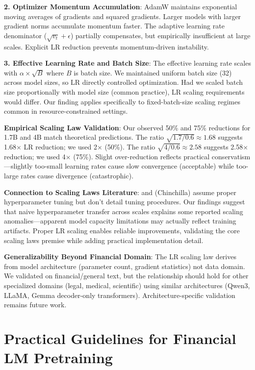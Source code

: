 \textbf{2. Optimizer Momentum Accumulation}: AdamW maintains exponential moving averages of gradients and squared gradients. Larger models with larger gradient norms accumulate momentum faster. The adaptive learning rate denominator ($\sqrt{v_t} + \epsilon$) partially compensates, but empirically insufficient at large scales. Explicit LR reduction prevents momentum-driven instability.

\textbf{3. Effective Learning Rate and Batch Size}: The effective learning rate scales with $\alpha \times \sqrt{B}$ where $B$ is batch size. We maintained uniform batch size (32) across model sizes, so LR directly controlled optimization. Had we scaled batch size proportionally with model size (common practice), LR scaling requirements would differ. Our finding applies specifically to fixed-batch-size scaling regimes common in resource-constrained settings.

\textbf{Empirical Scaling Law Validation}: Our observed 50\% and 75\% reductions for 1.7B and 4B match theoretical predictions. The ratio $\sqrt{1.7/0.6} \approx 1.68$ suggests 1.68$\times$ LR reduction; we used 2$\times$ (50\%). The ratio $\sqrt{4/0.6} \approx 2.58$ suggests 2.58$\times$ reduction; we used 4$\times$ (75\%). Slight over-reduction reflects practical conservatism—slightly too-small learning rates cause slow convergence (acceptable) while too-large rates cause divergence (catastrophic).

\textbf{Connection to Scaling Laws Literature}: \textcite{kaplan2020scaling} and \textcite{hoffmann2022training} (Chinchilla) assume proper hyperparameter tuning but don't detail tuning procedures. Our findings suggest that naive hyperparameter transfer across scales explains some reported scaling anomalies—apparent model capacity limitations may actually reflect training artifacts. Proper LR scaling enables reliable improvements, validating the core scaling laws premise while adding practical implementation detail.

\textbf{Generalizability Beyond Financial Domain}: The LR scaling law derives from model architecture (parameter count, gradient statistics) not data domain. We validated on financial/general text, but the relationship should hold for other specialized domains (legal, medical, scientific) using similar architectures (Qwen3, LLaMA, Gemma decoder-only transformers). Architecture-specific validation remains future work.

\section{Practical Guidelines for Financial LM Pretraining}

